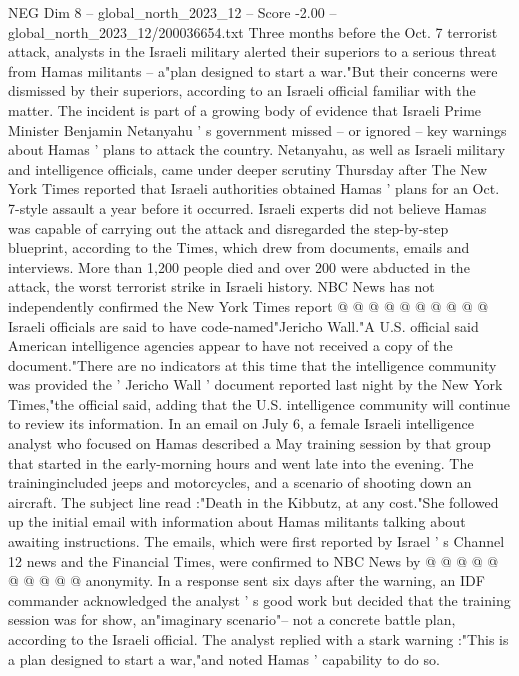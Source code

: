 \begin{textsample}{NEG Dim 8 – global\_north\_2023\_12 – Score -2.00 – global\_north\_2023\_12/200036654.txt}  \label{ex:f8_neg_169}
Three months before the Oct. 7 terrorist attack, analysts in the Israeli military alerted their superiors to a serious threat from Hamas militants -- a"plan designed to start a war."But their concerns were dismissed by their superiors, according to an Israeli official familiar with the matter.
The incident is part of a growing body of evidence that Israeli Prime Minister Benjamin Netanyahu ' s government missed -- or ignored -- key warnings about Hamas ' plans to attack the country.
Netanyahu, as well as Israeli military and intelligence officials, came under deeper scrutiny Thursday after The New York Times reported that Israeli authorities obtained Hamas ' plans for an Oct. 7-style assault a year before it occurred.
Israeli experts did not believe Hamas was capable of carrying out the attack and disregarded the step-by-step blueprint, according to the Times, which drew from documents, emails and interviews.
More than 1,200 people died and over 200 were abducted in the attack, the worst terrorist strike in Israeli history.
NBC News has not independently confirmed the New York Times report @ @ @ @ @ @ @ @ @ @ Israeli officials are said to have code-named"Jericho Wall."A U.S. official said American intelligence agencies appear to have not received a copy of the document."There are no indicators at this time that the intelligence community was provided the ' Jericho Wall ' document reported last night by the New York Times,"the official said, adding that the U.S. intelligence community will continue to review its information.
In an email on July 6, a female Israeli intelligence analyst who focused on Hamas described a May training session by that group that started in the early-morning hours and went late into the evening.
The trainingincluded jeeps and motorcycles, and a scenario of shooting down an aircraft.
The subject line read :"Death in the Kibbutz, at any cost."She followed up the initial email with information about Hamas militants talking about awaiting instructions.
The emails, which were first reported by Israel ' s Channel 12 news and the Financial Times, were confirmed to NBC News by @ @ @ @ @ @ @ @ @ @ anonymity.
In a response sent six days after the warning, an IDF commander acknowledged the analyst ' s good work but decided that the training session was for show, an"imaginary scenario"-- not a concrete battle plan, according to the Israeli official.
The analyst replied with a stark warning :"This is a plan designed to start a war,"and noted Hamas ' capability to do so.

\end{textsample}
